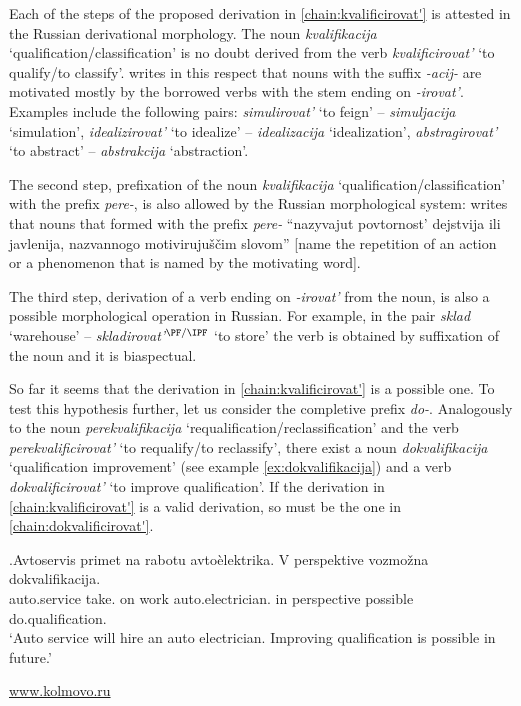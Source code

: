 Each of the steps of the proposed derivation in \ref{chain:kvalificirovat'} is attested in the Russian derivational morphology. The noun \textit{kvalifikacija} `qualification\slash classification' is no doubt derived from the verb \textit{kvalificirovat'} `to qualify/to classify'. \citet{Shvedova:82} writes in this respect that nouns with the suffix \textit{-acij-} are motivated mostly by the borrowed verbs with the stem ending on \textit{-irovat'}. Examples \citep[taken from][159]{Shvedova:82} include the following pairs: \textit{simulirovat'} `to feign' -- \textit{simuljacija} `simulation', \textit{idealizirovat'} `to idealize'  -- \textit{idealizacija} `idealization', \textit{abstragirovat'} `to abstract' -- \textit{abstrakcija} `abstraction'.

The second step, prefixation of the noun \textit{kvalifikacija} `qualification\slash classifica\-tion' with the prefix \textit{pere-}, is also allowed by the Russian morphological system: \citet[226]{Shvedova:82} writes that nouns that formed with the prefix \textit{pere-} ``nazyvajut povtornost' dejstvija ili javlenija, nazvannogo motiviruju\v{s}\v{c}im slovom'' [name the repetition of an action or a phenomenon that is named by the motivating word].

The third step, derivation of a verb ending on \textit{-irovat'} from the noun, is also a possible morphological operation in Russian. For example, in the pair \textit{sklad} `warehouse' -- \textit{skladirovat'}$^{{\PF}/{\IPF}}$ `to store' the verb is obtained by suffixation of the noun and it is biaspectual.

So far it seems that the derivation in \ref{chain:kvalificirovat'} is a possible one. To test this hypothesis further, let us consider the completive prefix \textit{do-}. Analogously to the noun \textit{perekvalifikacija} `requalification/reclassification' and the verb \textit{perekvalificirovat'} `to requalify/to reclassify', there exist a noun \textit{dokvalifikacija} `qualification improvement' (see example \ref{ex:dokvalifikacija}) and a verb \textit{dokvalificirovat'} `to improve qualification'. If the derivation in \ref{chain:kvalificirovat'} is a valid derivation, so must be the one in \ref{chain:dokvalificirovat'}.

\exg.\label{ex:dokvalifikacija}Avtoservis primet na rabotu avto\`{e}lektrika. V perspektive vozmo\v{z}na dokvalifikacija.\\
{auto.service} take. on work {auto.electrician.} in perspective possible do.qualification.\\
\vspace{0.5em}
`Auto service will hire an auto electrician. Improving qualification is possible in future.'
\begin{flushright}
\vspace{-0.5em}
\url{www.kolmovo.ru}
\end{flushright}

